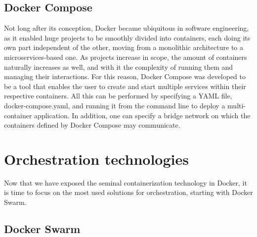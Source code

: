 \documentclass[thesis=B,english]{FITthesis}[2019/12/23]
\begin{document}
\subsection{Docker Compose}

Not long after its conception, Docker became ubiquitous in software engineering, as it enabled huge projects to be smoothly divided into containers, each doing its own part independent of the other, moving from a monolithic architecture to a microservices-based one. As projects increase in scope, the amount of containers naturally increases as well, and with it the complexity of running them and managing their interactions. For this reason, Docker Compose was developed to be a tool that enables the user to create and start multiple services within their respective containers. All this can be performed by specifying a YAML file, docker-compose.yaml, and running it from the command line to deploy a multi-container application. \cite{docker-compose-docs}
\newline
In addition, one can specify a bridge network on which the containers defined by Docker Compose may communicate.

\section{Orchestration technologies}

Now that we have exposed the seminal containerization technology in Docker, it is time to focus on the most used solutions for orchestration, starting with Docker Swarm.

\subsection{Docker Swarm}
\end{document}
